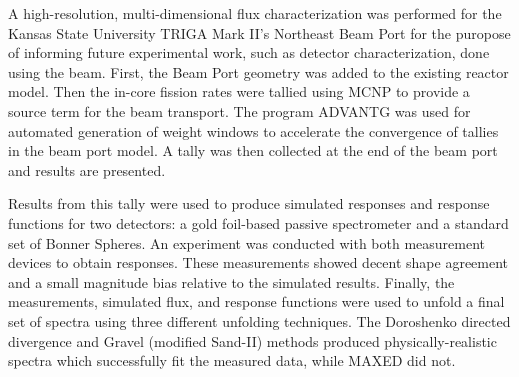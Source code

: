 
\pagestyle{empty}
\setlength{\baselineskip}{0.8cm}



A high-resolution, multi-dimensional flux characterization was performed for the Kansas State University TRIGA Mark II's Northeast Beam Port for the puropose of informing future experimental work, such as detector characterization, done using the beam.
First, the Beam Port geometry was added to the existing reactor model.
Then the in-core fission rates were tallied using MCNP to provide a source term for the beam transport.
The program ADVANTG was used for automated generation of weight windows to accelerate the convergence of tallies in the beam port model.
A tally was then collected at the end of the beam port and results are presented.

Results from this tally were used to produce simulated responses and response functions for two detectors: a gold foil-based passive spectrometer and a standard set of Bonner Spheres.
An experiment was conducted with both measurement devices to obtain responses.
These measurements showed decent shape agreement and a small magnitude bias relative to the simulated results.
Finally, the measurements, simulated flux, and response functions were used to unfold a final set of spectra using three different unfolding techniques.
The Doroshenko directed divergence and Gravel (modified Sand-II) methods produced physically-realistic spectra which successfully fit the measured data, while MAXED did not.

